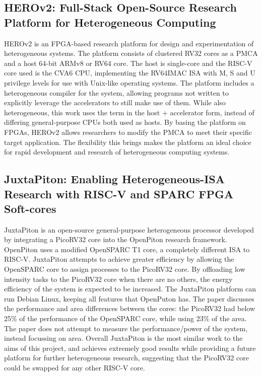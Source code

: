 \subsection{HEROv2: Full-Stack Open-Source Research Platform for Heterogeneous Computing\cite{herov2}}
HEROv2 is an FPGA-based research platform for design and experimentation of heterogeneous systems. The platform consists of clustered RV32 cores as a PMCA and a host 64-bit ARMv8 or RV64 core. The host is single-core and the RISC-V core used is the CVA6\cite{zaruba2019cost} CPU, implementing the RV64IMAC ISA with M, S and U privilege levels for use with Unix-like operating systems. The platform includes a heterogeneous compiler for the system, allowing programs not written to explicitly leverage the accelerators to still make use of them. While also heterogeneous, this work uses the term in the host + accelerator form, instead of differing general-purpose CPUs both used as hosts. By basing the platform on FPGAs, HEROv2 allows researchers to modify the PMCA to meet their specific target application. The flexibility this brings makes the platform an ideal choice for rapid development and research of heterogeneous computing systems.

\subsection{JuxtaPiton: Enabling Heterogeneous-ISA Research with RISC-V and SPARC FPGA Soft-cores\cite{lim2018juxtapiton}}
JuxtaPiton is an open-source general-purpose heterogeneous processor developed by integrating a PicoRV32\cite{picorv32} core into the OpenPiton\cite{openpiton} research framework. OpenPiton uses a modified OpenSPARC T1 core, a completely different ISA to RISC-V. JuxtaPiton attempts to achieve greater efficiency by allowing the OpenSPARC core to assign processes to the PicoRV32 core. By offloading low intensity tasks to the PicoRV32 core when there are no others, the energy efficiency of the system is expected to be increased. The JuxtaPiton platform can run Debian Linux, keeping all features that OpenPuton has. The paper discusses the performance and area differences between the cores: the PicoRV32 had below 25\% of the performance of the OpenSPARC core, while using 23\% of the area. The paper does not attempt to measure the performance/power of the system, instead focussing on area. Overall JuxtaPiton is the most similar work to the aims of this project, and achieves extremely good results while providing a future platform for further heterogeneous research, suggesting that the PicoRV32 core could be swapped for any other RISC-V core.